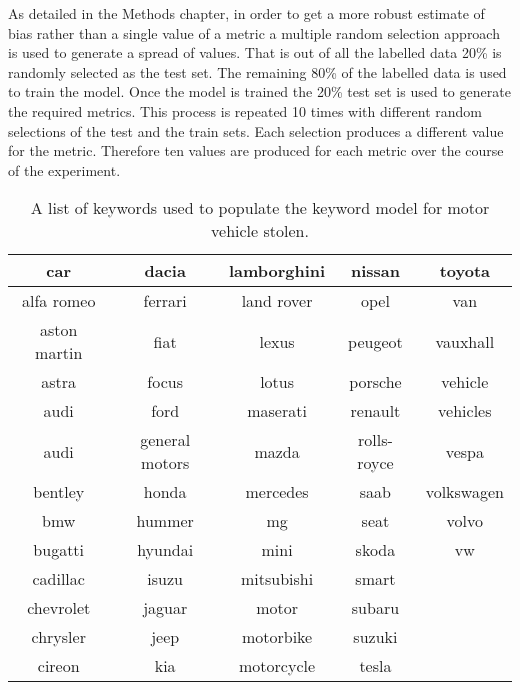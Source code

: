 As detailed in the Methods chapter, in order to get a more robust estimate of bias rather than a single value of a metric a multiple random selection approach is used to generate a spread of values. That is out of all the labelled data 20\% is randomly selected as the test set. The remaining 80\% of the labelled data is used to train the model. Once the model is trained the 20\% test set is used to generate the required metrics. This process is repeated 10 times with different random selections of the test and the train sets. Each selection produces a different value for the metric. Therefore ten values are produced for each metric over the course of the experiment. 




\begin{table}[]
\begin{tabular}{|c|c|c|c|c|}
\hline
car          & dacia          & lamborghini & nissan      & toyota     \\ \hline
alfa romeo   & ferrari        & land rover  & opel        & van        \\ \hline
aston martin & fiat           & lexus       & peugeot     & vauxhall   \\ \hline
astra        & focus          & lotus       & porsche     &  vehicle  \\ \hline
audi         & ford           & maserati    & renault     &  vehicles    \\ \hline
audi         & general motors & mazda       & rolls-royce & vespa  \\ \hline
bentley      & honda          & mercedes    & saab        & volkswagen      \\ \hline
bmw          & hummer         & mg          & seat        & volvo   \\ \hline
bugatti      & hyundai        & mini        & skoda       & vw       \\ \hline
cadillac     & isuzu          & mitsubishi  & smart       &       \\ \hline
chevrolet    & jaguar         & motor       & subaru      &            \\ \hline
chrysler     & jeep           & motorbike   & suzuki      &            \\ \hline
cireon       & kia            & motorcycle  & tesla       &            \\ \hline
\end{tabular}
\caption[Keywords for keyword model - motor vehicle stolen]{\label{tab:Keywords} A list of keywords used to populate the  keyword model for motor vehicle stolen.}
\end{table}


